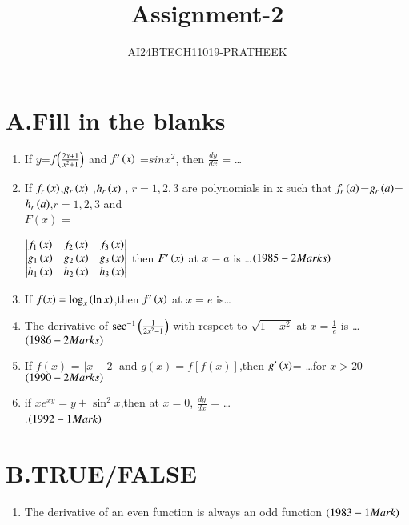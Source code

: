 \documentclass[journal,12pt,onecolumn]{IEEEtran}
\theoremstyle{remark}
\begin{document}

\vspace{3cm}

\title{Assignment-2}
\author{AI24BTECH11019-PRATHEEK}
\maketitle

\bigskip

\renewcommand{\thefigure}{\theenumi}
\renewcommand{\thetable}{\theenumi}

\section*{A.Fill in the blanks}
\begin{enumerate}
    \item If $y$=$f{\left(\frac{2x+1}{x^2+1}\right)}$ and $f'\left(x\right)$ =$sin{x}^2$, then $\frac{dy}{dx}$ = \dots\hfill {} 
    \item If $f_r\left(x\right)$,$g_r\left(x\right)$ ,$h_r\left(x\right)$ , $r=1,2,3$ are polynomials in x such that  $f_r\left(a\right)$=$g_r\left(a\right)$=$h_r\left(a\right)$,$r=1,2,3$ and \\$F(x)$ = 


    $\begin{vmatrix}
			f_1\left(x\right) & f_2\left(x\right) & f_3\left(x\right) \\
			g_1\left(x\right) & g_2\left(x\right) & g_3\left(x\right)\\
			h_1\left(x\right) & h_2\left(x\right)& h_3\left(x\right)
		\end{vmatrix}  $
    then $F'\left(x\right)$ at $x=a$ is \dots $\hfill\brak{1985 -2Marks}$
\item If $f(x)=\log_{x}\left(\ln{x}\right)$,then $f'\left(x\right)$ at $x=e$ is\dots \hfill {} 
\item The derivative of $\sec^{-1}{\left(\frac{1}{2x^2-1}\right)}$ with respect to $\sqrt{1-x^2}$
at $x=\frac{1}{e}$ is \dots $\hfill\brak{1986 -2Marks}$
\item If $f(x)$ = $|x-2|$ and $g(x)=f[f(x)]$,then $g'\left(x\right)$= \dots for $x>20$ $\hfill\brak{1990-2 Marks}$  
\item if $xe^{xy}=y+\sin^2{x}$,then at $x=0$, $\frac{dy}{dx}$ = \dots\\.$\hfill \brak{1992-1Mark}$
\end{enumerate}
\section*{B.TRUE/FALSE}
\begin{enumerate}
    \item The derivative of an even function is always an odd function $\hfill\brak{1983-1 Mark}$
\end{enumerate}
\end{document}
